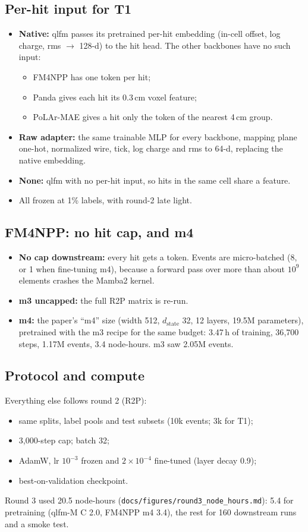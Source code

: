 \documentclass[11pt,a4paper]{article}
\newcommand{\code}[1]{\texttt{\small #1}}
\begin{document}
\subsection{Per-hit input for T1}
\begin{itemize}
  \item \textbf{Native:} qlfm passes its pretrained per-hit embedding (in-cell offset, log charge, rms $\to$ 128-d) to the hit head. The other backbones have no such input:
    \begin{itemize}
      \item FM4NPP has one token per hit;
      \item Panda gives each hit its 0.3\,cm voxel feature;
      \item PoLAr-MAE gives a hit only the token of the nearest 4\,cm group.
    \end{itemize}
  \item \textbf{Raw adapter:} the same trainable MLP for every backbone, mapping plane one-hot, normalized wire, tick, log charge and rms to 64-d, replacing the native embedding.
  \item \textbf{None:} qlfm with no per-hit input, so hits in the same cell share a feature.
  \item All frozen at 1\% labels, with round-2 late light.
\end{itemize}

\subsection{FM4NPP: no hit cap, and m4}
\begin{itemize}
  \item \textbf{No cap downstream:} every hit gets a token. Events are micro-batched (8, or 1 when fine-tuning m4), because a forward pass over more than about $10^9$ elements crashes the Mamba2 kernel.
  \item \textbf{m3 uncapped:} the full R2P matrix is re-run.
  \item \textbf{m4:} the paper's ``m4'' size (width 512, $d_\text{state}$ 32, 12 layers, 19.5M parameters), pretrained with the m3 recipe for the same budget: 3.47\,h of training, 36{,}700 steps, 1.17M events, 3.4 node-hours. m3 saw 2.05M events.
\end{itemize}

\subsection{Protocol and compute}
Everything else follows round 2 (R2P):
\begin{itemize}
  \item same splits, label pools and test subsets (10k events; 3k for T1);
  \item 3{,}000-step cap; batch 32;
  \item AdamW, lr $10^{-3}$ frozen and $2\times10^{-4}$ fine-tuned (layer decay 0.9);
  \item best-on-validation checkpoint.
\end{itemize}
Round 3 used 20.5 node-hours (\code{docs/figures/round3\_node\_hours.md}): 5.4 for pretraining (qlfm-M C 2.0, FM4NPP m4 3.4), the rest for 160 downstream runs and a smoke test.
\end{document}
